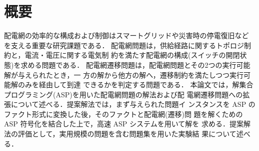 \chapter*{概要}
配電網の効率的な構成および制御はスマートグリッドや災害時の停電復旧など
を支える重要な研究課題である．
%
配電網問題は，供給経路に関するトポロジ制約と，電流・電圧に関する電気制
約を満たす配電網の構成(スイッチの開閉状態)を求める問題である．
%
配電網遷移問題は，配電網問題とその2つの実行可能解が与えられたとき，一
方の解から他方の解へ，遷移制約を満たしつつ実行可能解のみを経由して到達
できるかを判定する問題である．
%
本論文では，解集合プログラミング(ASP)を用いた配電網問題の解法および配
電網遷移問題への拡張について述べる．提案解法では，まず与えられた問題イ
ンスタンスを ASP のファクト形式に変換した後，そのファクトと配電網(遷移)問
題を解くための ASP 符号化を結合した上で，高速 ASP システムを用いて解を
求める．提案解法の評価として，実用規模の問題を含む問題集を用いた実験結
果について述べる．


